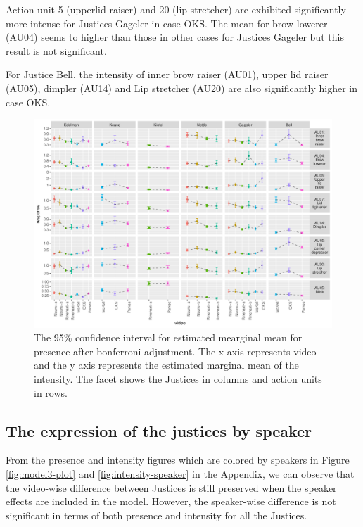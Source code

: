 \documentclass{monashthesis}
\begin{document}
Action unit 5 (upperlid raiser) and 20 (lip stretcher) are exhibited significantly more intense for Justices Gageler in case OKS. The mean for brow lowerer (AU04) seems to higher than those in other cases for Justices Gageler but this result is not significant.

For Justice Bell, the intensity of inner brow raiser (AU01), upper lid raiser (AU05), dimpler (AU14) and Lip stretcher (AU20) are also significantly higher in case OKS.

\begin{figure}

{\centering \includegraphics[width=1\linewidth]{figures/intensity-video-1} 

}

\caption{The 95\% confidence interval for estimated mearginal mean for presence after bonferroni adjustment. The x axis represents video and the y axis represents the estimated marginal mean of the intensity. The facet shows the Justices in columns and action units in rows. }\label{fig:intensity-video}
\end{figure}

\hypertarget{the-expression-of-the-justices-by-speaker}{%
\subsection{The expression of the justices by speaker}\label{the-expression-of-the-justices-by-speaker}}

From the presence and intensity figures which are colored by speakers in Figure \ref{fig:model3-plot} and \ref{fig:intensity-speaker} in the Appendix, we can observe that the video-wise difference between Justices is still preserved when the speaker effects are included in the model. However, the speaker-wise difference is not significant in terms of both presence and intensity for all the Justices.
\end{document}
